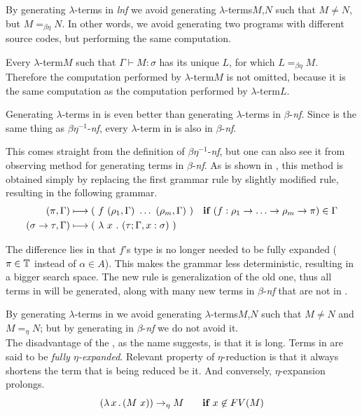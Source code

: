 \documentclass[12pt,a4paper]{report}
\newcommand{\lterm}{$\lambda$-term\xspace}
\newcommand{\lterms}{$\lambda$-terms\xspace}
\newcommand{\turst}[3]{$#1\vdash{}#2:#3$\xspace}
\newcommand{\GMS}{\turst{\Gamma}{M}{\sigma}}
\begin{document}
By generating \lterms in \textit{lnf} we avoid generating 
\lterms $M$,$N$ such that $M \not= N$, but $M =_{\beta\eta} N$.
In other words, we avoid generating two programs with different 
source codes, but performing the same computation.

Every \lterm $M$ such that \GMS has its unique \lnf $L$, 
for which $L =_{\beta\eta} M$.
Therefore the computation performed by \lterm $M$ 
is not omitted, because it is the same computation
as the computation performed by \lterm $L$. \\

\newcommand{\bnf}{$\beta$-\textit{nf}\xspace}
\newcommand{\beenf}{$\beta\eta^{-1}$-\textit{nf}\xspace}

Generating \lterms in \lnf is even better than generating 
\lterms in \bnf. Since \lnf is the same thing as \beenf,
every \lterm in \lnf is also in \bnf. 

This comes straight from the definition of \beenf, 
but one can also see it from observing method for generating
terms in \bnf. As is shown in \cite{barendregt10}, 
this method is obtained simply by replacing  
the first grammar rule by slightly modified rule,
resulting in the following grammar.
\begin{align*}
( \pi , \Gamma )  
&\gar
(~f~( \rho_1 , \Gamma )~\dots~( \rho_m , \Gamma )~)
& \textbf{if } (f : \rho_1 \ar \dots \ar \rho_m \ar \pi) \in \Gamma
\\ 
( \sigma \rightarrow \tau , \Gamma )  
&\gar
(~\lambda~x~.~( \tau ; \Gamma,x:\sigma )~)
&   
\end{align*}

The difference lies in that $f$'s type is no longer needed to be fully expanded
($\pi \in \mathbb{T}$ instead of $\alpha \in A$). This makes the grammar less deterministic,
resulting in a bigger search space. The new rule is generalization of the old one,
thus all terms in \lnf will be generated, along with many new terms in \bnf that 
are not in \lnf. 
    
By generating \lterms in \lnf we avoid generating 
\lterms $M$,$N$ such that $M \not= N$ and $M =_{\eta} N$; 
but by generating in \bnf we do not avoid it.\\


The disadvantage of the \lnf, as the name suggests, is that it is long.
Terms in \lnf are said to be \textit{fully $\eta$-expanded}. 
Relevant property of $\eta$-reduction is that it always shortens the term
that is being reduced be it. And conversely, $\eta$-expansion prolongs.
$$( \lambda \, x \, . \, (M~x) ) \rightarrow_\eta M \textbf{ ~~~~if } x \not\in FV(M) $$
\end{document}
